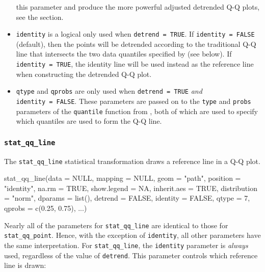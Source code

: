 \begin{itemize}
  this parameter and produce the more powerful adjusted detrended Q-Q
  plots, see the  section.
\item
  \texttt{identity} is a logical only used when
  \texttt{detrend\ =\ TRUE}. If \texttt{identity\ =\ FALSE} (default),
  then the points will be detrended according to the traditional Q-Q
  line that intersects the two data quantiles specified by 
  (see below). If \texttt{identity\ =\ TRUE}, the identity line will be
  used instead as the reference line when constructing the detrended Q-Q
  plot.
\item
  \texttt{qtype} and \texttt{qprobs} are only used when
  \texttt{detrend\ =\ TRUE} \emph{and} \texttt{identity\ =\ FALSE}.
  These parameters are passed on to the \texttt{type} and \texttt{probs}
  parameters of the \texttt{quantile} function from , both of
  which are used to specify which quantiles are used to form the Q-Q
  line.
\end{itemize}

\subsubsection{\texorpdfstring{\texttt{stat\_qq\_line}}{stat\_qq\_line}}\label{stat_qq_line}

The \texttt{stat\_qq\_line} statistical transformation draws a reference
line in a Q-Q plot.

\begin{Schunk}
\begin{Sinput}
stat_qq_line(data = NULL,
             mapping = NULL,
             geom = "path",
             position = "identity",
             na.rm = TRUE,
             show.legend = NA,
             inherit.aes = TRUE,
             distribution = "norm",
             dparams = list(),
             detrend = FALSE,
             identity = FALSE,
             qtype = 7,
             qprobs = c(0.25, 0.75),
             ...)
\end{Sinput}
\end{Schunk}

Nearly all of the parameters for \texttt{stat\_qq\_line} are identical
to those for \texttt{stat\_qq\_point}. Hence, with the exception of
\texttt{identity}, all other parameters have the same interpretation.
For \texttt{stat\_qq\_line}, the \texttt{identity} parameter is
\emph{always} used, regardless of the value of \texttt{detrend}. This
parameter controls which reference line is drawn:

